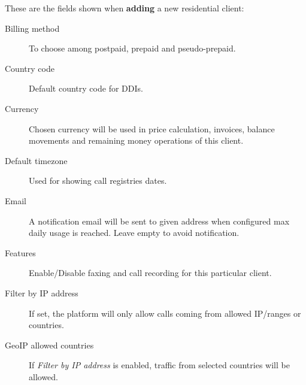 \documentclass[letterpaper,10pt,spanish]{sphinxmanual}
\begin{document}
These are the fields shown when \textbf{adding} a new residential client:
\begin{description}
\item[{Billing method}] \leavevmode{}\label{administration_portal/brand/clients/residential:term-billing-method}
To choose among postpaid, prepaid and pseudo-prepaid.

\item[{Country code}] \leavevmode{}\label{administration_portal/brand/clients/residential:term-country-code}
Default country code for DDIs.

\item[{Currency}] \leavevmode{}\label{administration_portal/brand/clients/residential:term-currency}
Chosen currency will be used in price calculation, invoices, balance movements and
remaining money operations of this client.

\item[{Default timezone}] \leavevmode{}\label{administration_portal/brand/clients/residential:term-default-timezone}
Used for showing call registries dates.

\item[{Email}] \leavevmode{}\label{administration_portal/brand/clients/residential:term-email}
A notification email will be sent to given address when configured max daily usage is reached. Leave empty to
avoid notification.

\item[{Features}] \leavevmode{}\label{administration_portal/brand/clients/residential:term-features}
Enable/Disable faxing and call recording for this particular client.

\item[{Filter by IP address}] \leavevmode{}\label{administration_portal/brand/clients/residential:term-filter-by-ip-address}
If set, the platform will only allow calls coming from allowed IP/ranges or countries.

\item[{GeoIP allowed countries}] \leavevmode{}\label{administration_portal/brand/clients/residential:term-geoip-allowed-countries}
If \emph{Filter by IP address} is enabled, traffic from selected countries will be allowed.


\end{description}
\end{document}
